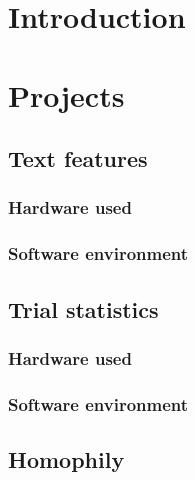 \documentclass{article}
\begin{document}
\maketitle
\tableofcontents

\section{Introduction}

\section{Projects}
\subsection{Text features}

\subsubsection{Hardware used}

\subsubsection{Software environment}


\subsection{Trial statistics}

\subsubsection{Hardware used}

\subsubsection{Software environment}


\subsection{Homophily}
\end{document}
